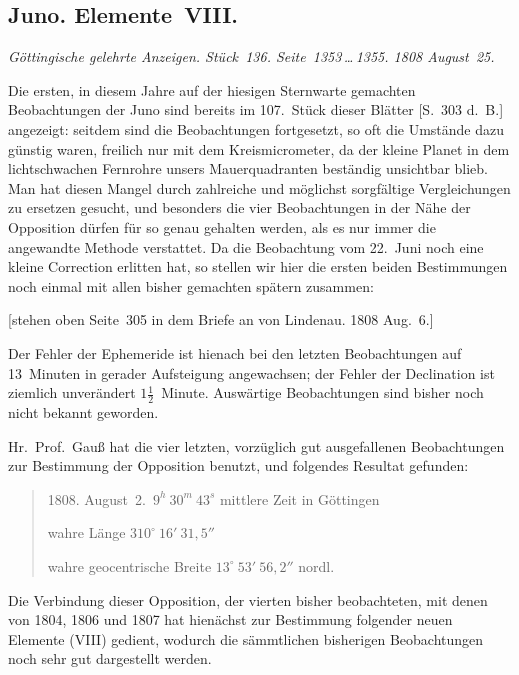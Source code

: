 \documentclass[12pt,a4paper]{book}
\begin{document}
\subsection*{Juno. Elemente~VIII.}

\textit{G\"ottingische gelehrte Anzeigen. St\"uck~136. Seite~1353\,\ldots\,1355. 1808 August~25.}

Die ersten, in diesem Jahre auf der hiesigen Sternwarte gemachten Beobachtungen der Juno sind bereits im 107.~St\"uck dieser Bl\"atter [S.~303 d.~B.] angezeigt: seitdem sind die Beobachtungen fortgesetzt, so oft die Umst\"ande dazu g\"unstig waren, freilich nur mit dem Kreismicrometer, da der kleine Planet in dem lichtschwachen Fernrohre unsers Mauerquadranten best\"andig unsichtbar blieb. Man hat diesen Mangel durch zahlreiche und m\"oglichst sorgf\"altige Vergleichungen zu ersetzen gesucht, und besonders die vier Beobachtungen in der N\"ahe der Opposition d\"urfen f\"ur so genau gehalten werden, als es nur immer die angewandte Methode verstattet. Da die Beobachtung vom 22.~Juni noch eine kleine Correction erlitten hat, so stellen wir hier die ersten beiden Bestimmungen noch einmal mit allen bisher gemachten sp\"atern zusammen:

[stehen oben Seite~305 in dem Briefe an von Lindenau. 1808 Aug.~6.]

Der Fehler der Ephemeride ist hienach bei den letzten Beobachtungen auf 13~Minuten in gerader Aufsteigung angewachsen; der Fehler der Declination ist ziemlich unver\"andert $1\frac12$~Minute. Ausw\"artige Beobachtungen sind bisher noch nicht bekannt geworden.

Hr.~Prof.~Gau{\ss} hat die vier letzten, vorz\"uglich gut ausgefallenen Beobachtungen zur Bestimmung der Opposition benutzt, und folgendes Resultat gefunden:

\begin{quote}
1808. August~2.\ $9^{h}\ 30^{m}\ 43^{s}$ mittlere Zeit in G\"ottingen

wahre L\"ange \dotfill $310^{\circ}\ 16'\ 31{,}5''$

wahre geocentrische Breite \dotfill $13^{\circ}\ 53'\ 56{,}2''$ nordl.
\end{quote}

Die Verbindung dieser Opposition, der vierten bisher beobachteten, mit denen von 1804, 1806 und 1807 hat hien\"achst zur Bestimmung folgender neuen Elemente (VIII) gedient, wodurch die s\"ammtlichen bisherigen Beobachtungen noch sehr gut dargestellt werden.
\end{document}
